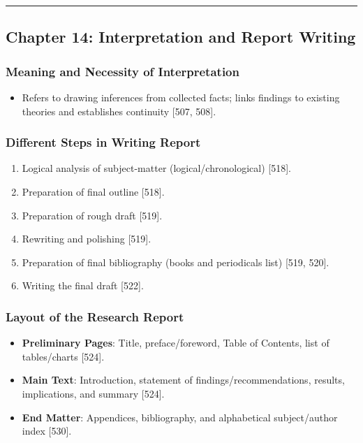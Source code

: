 \documentclass[
]{article}
\providecommand{\tightlist}{%
  \setlength{\itemsep}{0pt}\setlength{\parskip}{0pt}}
\begin{document}
\begin{center}\rule{0.5\linewidth}{0.5pt}\end{center}

\subsection{Chapter 14: Interpretation and Report
Writing}\label{chapter-14-interpretation-and-report-writing}

\subsubsection{Meaning and Necessity of
Interpretation}\label{meaning-and-necessity-of-interpretation}

\begin{itemize}
\tightlist
\item
  Refers to drawing inferences from collected facts; links findings to
  existing theories and establishes continuity {[}507, 508{]}.
\end{itemize}

\subsubsection{Different Steps in Writing
Report}\label{different-steps-in-writing-report}

\begin{enumerate}
\def\labelenumi{\arabic{enumi}.}
\tightlist
\item
  Logical analysis of subject-matter (logical/chronological) {[}518{]}.
\item
  Preparation of final outline {[}518{]}.
\item
  Preparation of rough draft {[}519{]}.
\item
  Rewriting and polishing {[}519{]}.
\item
  Preparation of final bibliography (books and periodicals list) {[}519,
  520{]}.
\item
  Writing the final draft {[}522{]}.
\end{enumerate}

\subsubsection{Layout of the Research
Report}\label{layout-of-the-research-report}

\begin{itemize}
\tightlist
\item
  \textbf{Preliminary Pages}: Title, preface/foreword, Table of
  Contents, list of tables/charts {[}524{]}.
\item
  \textbf{Main Text}: Introduction, statement of
  findings/recommendations, results, implications, and summary
  {[}524{]}.
\item
  \textbf{End Matter}: Appendices, bibliography, and alphabetical
  subject/author index {[}530{]}.
\end{itemize}
\end{document}
